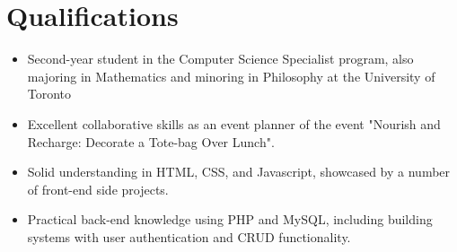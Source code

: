 \documentclass[a4paper,10pt]{article} %
\makeatletter
\newenvironment{joblong}[2]
    {
    \begin{tabularx}{\linewidth}{@{}l X r@{}}
    \textbf{#1} & \hfill &  #2 \\[3.75pt]
    \end{tabularx}
    \begin{minipage}[t]{\linewidth}
    \begin{itemize}[nosep,after=\strut, leftmargin=1em, itemsep=3pt,label=--]
    }
    {
    \end{itemize}
    \end{minipage}    
    }
\makeatother
\begin{document}

\section{Qualifications}
\begin{itemize}
    \item Second-year student in the Computer Science Specialist program, also majoring in Mathematics and minoring in Philosophy at the University of Toronto
    \item Excellent collaborative skills as an event planner of the event "Nourish and Recharge: Decorate a Tote-bag Over Lunch".
    \item Solid understanding in HTML, CSS, and Javascript, showcased by a number of front-end side projects.
    \item Practical back-end knowledge using PHP and MySQL, including building systems with user authentication and CRUD functionality.
\end{itemize}

\end{document}
